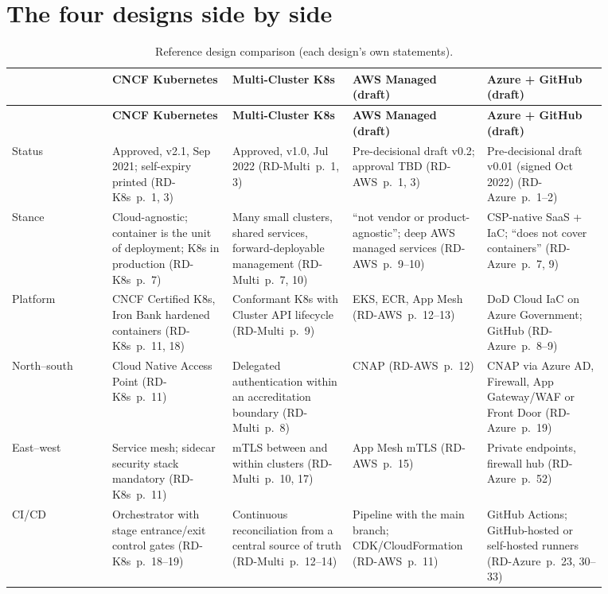 \documentclass[11pt,letterpaper,twoside,openany]{memoir}
\newcommand{\pg}[2]{{\small(#1~p.~#2)}}          %
\begin{document}
\section{The four designs side by side}
{\footnotesize
\begin{longtable}{@{}L{0.15\linewidth}L{0.18\linewidth}L{0.18\linewidth}L{0.18\linewidth}L{0.18\linewidth}@{}}
\caption{Reference design comparison (each design's own statements).}\label{tab:rd}\\
\toprule & \sffamily\bfseries CNCF Kubernetes & \sffamily\bfseries Multi-Cluster K8s & \sffamily\bfseries AWS Managed (draft) & \sffamily\bfseries Azure + GitHub (draft)\\ \midrule\endfirsthead
\toprule & \sffamily\bfseries CNCF Kubernetes & \sffamily\bfseries Multi-Cluster K8s & \sffamily\bfseries AWS Managed (draft) & \sffamily\bfseries Azure + GitHub (draft)\\ \midrule\endhead
\bottomrule\endfoot
Status & Approved, v2.1, Sep 2021; self-expiry printed \pg{RD-K8s}{1, 3} & Approved, v1.0, Jul 2022 \pg{RD-Multi}{1, 3} & Pre-decisional draft v0.2; approval TBD \pg{RD-AWS}{1, 3} & Pre-decisional draft v0.01 (signed Oct 2022) \pg{RD-Azure}{1--2}\\
Stance & Cloud-agnostic; container is the unit of deployment; K8s in production \pg{RD-K8s}{7} & Many small clusters, shared services, forward-deployable management \pg{RD-Multi}{7, 10} & ``not vendor or product-agnostic''; deep AWS managed services \pg{RD-AWS}{9--10} & CSP-native SaaS + IaC; ``does not cover containers'' \pg{RD-Azure}{7, 9}\\
Platform & CNCF Certified K8s, Iron Bank hardened containers \pg{RD-K8s}{11, 18} & Conformant K8s with Cluster API lifecycle \pg{RD-Multi}{9} & EKS, ECR, App Mesh \pg{RD-AWS}{12--13} & DoD Cloud IaC on Azure Government; GitHub \pg{RD-Azure}{8--9}\\
North--south & Cloud Native Access Point \pg{RD-K8s}{11} & Delegated authentication within an accreditation boundary \pg{RD-Multi}{8} & CNAP \pg{RD-AWS}{12} & CNAP via Azure AD, Firewall, App Gateway/WAF or Front Door \pg{RD-Azure}{19}\\
East--west & Service mesh; sidecar security stack mandatory \pg{RD-K8s}{11} & mTLS between and within clusters \pg{RD-Multi}{10, 17} & App Mesh mTLS \pg{RD-AWS}{15} & Private endpoints, firewall hub \pg{RD-Azure}{52}\\
CI/CD & Orchestrator with stage entrance/exit control gates \pg{RD-K8s}{18--19} & Continuous reconciliation from a central source of truth \pg{RD-Multi}{12--14} & Pipeline with the main branch; CDK/CloudFormation \pg{RD-AWS}{11} & GitHub Actions; GitHub-hosted or self-hosted runners \pg{RD-Azure}{23, 30--33}\\

\end{longtable}}
\end{document}
